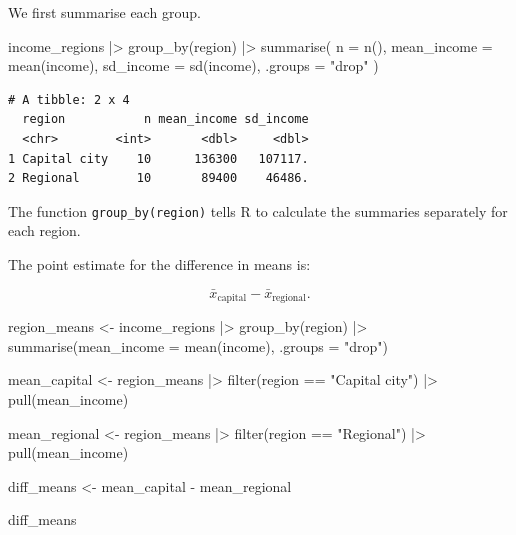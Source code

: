 \documentclass[
  letterpaper,
  DIV=11,
  numbers=noendperiod]{scrreprt}
\newenvironment{Shaded}{\begin{snugshade}}{\end{snugshade}}
\newcommand{\AttributeTok}[1]{\textcolor[rgb]{0.40,0.45,0.13}{#1}}
\newcommand{\FunctionTok}[1]{\textcolor[rgb]{0.28,0.35,0.67}{#1}}
\newcommand{\NormalTok}[1]{\textcolor[rgb]{0.00,0.23,0.31}{#1}}
\newcommand{\OtherTok}[1]{\textcolor[rgb]{0.00,0.23,0.31}{#1}}
\newcommand{\SpecialCharTok}[1]{\textcolor[rgb]{0.37,0.37,0.37}{#1}}
\newcommand{\StringTok}[1]{\textcolor[rgb]{0.13,0.47,0.30}{#1}}
\begin{document}
We first summarise each group.

\begin{Shaded}
\begin{Highlighting}[]
\NormalTok{income\_regions }\SpecialCharTok{|\textgreater{}}
  \FunctionTok{group\_by}\NormalTok{(region) }\SpecialCharTok{|\textgreater{}}
  \FunctionTok{summarise}\NormalTok{(}
    \AttributeTok{n =} \FunctionTok{n}\NormalTok{(),}
    \AttributeTok{mean\_income =} \FunctionTok{mean}\NormalTok{(income),}
    \AttributeTok{sd\_income =} \FunctionTok{sd}\NormalTok{(income),}
    \AttributeTok{.groups =} \StringTok{"drop"}
\NormalTok{  )}
\end{Highlighting}
\end{Shaded}

\begin{verbatim}
# A tibble: 2 x 4
  region           n mean_income sd_income
  <chr>        <int>       <dbl>     <dbl>
1 Capital city    10      136300   107117.
2 Regional        10       89400    46486.
\end{verbatim}

The function \texttt{group\_by(region)} tells R to calculate the
summaries separately for each region.

The point estimate for the difference in means is:

\[
\bar{x}_{\text{capital}} - \bar{x}_{\text{regional}}.
\]

\begin{Shaded}
\begin{Highlighting}[]
\NormalTok{region\_means }\OtherTok{\textless{}{-}}\NormalTok{ income\_regions }\SpecialCharTok{|\textgreater{}}
  \FunctionTok{group\_by}\NormalTok{(region) }\SpecialCharTok{|\textgreater{}}
  \FunctionTok{summarise}\NormalTok{(}\AttributeTok{mean\_income =} \FunctionTok{mean}\NormalTok{(income), }\AttributeTok{.groups =} \StringTok{"drop"}\NormalTok{)}

\NormalTok{mean\_capital }\OtherTok{\textless{}{-}}\NormalTok{ region\_means }\SpecialCharTok{|\textgreater{}}
  \FunctionTok{filter}\NormalTok{(region }\SpecialCharTok{==} \StringTok{"Capital city"}\NormalTok{) }\SpecialCharTok{|\textgreater{}}
  \FunctionTok{pull}\NormalTok{(mean\_income)}

\NormalTok{mean\_regional }\OtherTok{\textless{}{-}}\NormalTok{ region\_means }\SpecialCharTok{|\textgreater{}}
  \FunctionTok{filter}\NormalTok{(region }\SpecialCharTok{==} \StringTok{"Regional"}\NormalTok{) }\SpecialCharTok{|\textgreater{}}
  \FunctionTok{pull}\NormalTok{(mean\_income)}

\NormalTok{diff\_means }\OtherTok{\textless{}{-}}\NormalTok{ mean\_capital }\SpecialCharTok{{-}}\NormalTok{ mean\_regional}

\NormalTok{diff\_means}
\end{Highlighting}
\end{Shaded}
\end{document}
